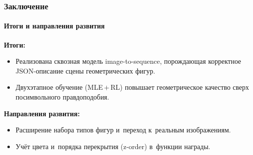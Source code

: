 \documentclass{beamer}
\begin{document}
\begin{frame}
\frametitle{Заключение}
\framesubtitle{Итоги и направления развития}
\textbf{Итоги:}
\begin{itemize}
  \item Реализована сквозная модель image-to-sequence, порождающая корректное JSON-описание сцены геометрических фигур.
  \item Двухэтапное обучение (MLE\,$+$\,RL) повышает геометрическое качество сверх посимвольного правдоподобия.
\end{itemize}
\textbf{Направления развития:}
\begin{itemize}
  \item Расширение набора типов фигур и~переход к~реальным изображениям.
  \item Учёт цвета и~порядка перекрытия (z-order) в~функции награды.
\end{itemize}
\end{frame}
\end{document}
